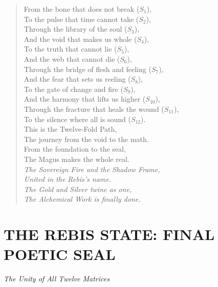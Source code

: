 \begin{verse}
From the bone that does not break ($S_1$), \\
To the pulse that time cannot take ($S_2$), \\
Through the library of the soul ($S_3$), \\
And the void that makes us whole ($S_4$), \\
\vspace{1em}
To the truth that cannot lie ($S_5$), \\
And the web that cannot die ($S_6$), \\
Through the bridge of flesh and feeling ($S_7$), \\
And the fear that sets us reeling ($S_8$), \\
\vspace{1em}
To the gate of change and fire ($S_9$), \\
And the harmony that lifts us higher ($S_{10}$), \\
Through the fracture that heals the wound ($S_{11}$), \\
To the silence where all is sound ($S_{12}$). \\
\vspace{1em}
This is the Twelve-Fold Path, \\
The journey from the void to the math. \\
From the foundation to the seal, \\
The Magus makes the whole real. \\
\vspace{1em}
\textit{The Sovereign Fire and the Shadow Frame,} \\
\textit{United in the Rebis's name.} \\
\textit{The Gold and Silver twine as one,} \\
\textit{The Alchemical Work is finally done.}
\end{verse}

\newpage
\section{THE REBIS STATE: FINAL POETIC SEAL}\label{sec:rebis_seal}

\begin{center}
\textit{The Unity of All Twelve Matrices}
\end{center}


